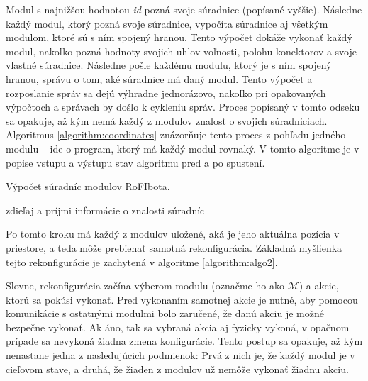 \documentclass[
  digital, %
  oneside, %
  notable,   %
  lof,     %
  nolot,     %
]{fithesis3}
\begin{document}
Modul s najnižšou hodnotou \textit{id} pozná svoje súradnice (popísané vyššie). Následne každý modul, ktorý pozná svoje súradnice, vypočíta súradnice aj všetkým modulom, ktoré sú s ním spojený hranou. Tento výpočet dokáže vykonať každý modul, nakoľko pozná hodnoty svojich uhlov voľnosti, polohu konektorov a svoje vlastné súradnice. Následne pošle každému modulu, ktorý je s ním spojený hranou, správu o tom, aké súradnice má daný modul. Tento výpočet a rozposlanie správ sa dejú výhradne jednorázovo, nakoľko pri opakovaných výpočtoch a správach by došlo k cykleniu správ. Proces popísaný v tomto odseku sa opakuje, až kým nemá každý z modulov znalosť o svojich súradniciach. Algoritmus \ref{algorithm:coordinates} znázorňuje tento proces z pohľadu jedného modulu -- ide o program, ktorý má každý modul rovnaký. V tomto algoritme je v popise vstupu a výstupu stav algoritmu pred a po spustení. 

\begin{algorithm}
    \caption{Výpočet súradníc modulov RoFIbota. }
    \label{algorithm:coordinates}
    
    \DontPrintSemicolon
    
    zdieľaj a príjmi informácie o znalosti súradníc\;
\end{algorithm}

Po tomto kroku má každý z modulov uložené, aká je jeho aktuálna pozícia v priestore, a teda môže prebiehať samotná rekonfigurácia. Základná myšlienka tejto rekonfigurácie je zachytená v algoritme \ref{algorithm:algo2}. 

Slovne, rekonfigurácia začína výberom modulu (označme ho ako $\mathcal{M}$) a akcie, ktorú sa pokúsi vykonať. Pred vykonaním samotnej akcie je nutné, aby pomocou komunikácie s ostatnými modulmi bolo zaručené, že danú akciu je možné bezpečne vykonať. Ak áno, tak sa vybraná akcia aj fyzicky vykoná, v opačnom prípade sa nevykoná žiadna zmena konfigurácie. Tento postup sa opakuje, až kým nenastane jedna z nasledujúcich podmienok: Prvá z nich je, že každý modul je v cieľovom stave, a druhá, že žiaden z modulov už nemôže vykonať žiadnu akciu. 
\end{document}
